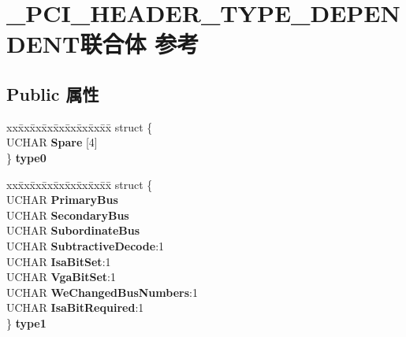 \hypertarget{union___p_c_i___h_e_a_d_e_r___t_y_p_e___d_e_p_e_n_d_e_n_t}{}\section{\+\_\+\+P\+C\+I\+\_\+\+H\+E\+A\+D\+E\+R\+\_\+\+T\+Y\+P\+E\+\_\+\+D\+E\+P\+E\+N\+D\+E\+N\+T联合体 参考}
\label{union___p_c_i___h_e_a_d_e_r___t_y_p_e___d_e_p_e_n_d_e_n_t}
\subsection*{Public 属性}
\begin{DoxyCompactItemize}
\item 
\mbox{\label{union___p_c_i___h_e_a_d_e_r___t_y_p_e___d_e_p_e_n_d_e_n_t_af89ec21f11e01bd34a64cc8f4c7dcf5a}} 
\begin{tabbing}
xx\=xx\=xx\=xx\=xx\=xx\=xx\=xx\=xx\=\kill
struct \{\\
\>UCHAR {\bfseries Spare} \mbox{[}4\mbox{]}\\
\} {\bfseries type0}\\

\end{tabbing}\item 
\mbox{\label{union___p_c_i___h_e_a_d_e_r___t_y_p_e___d_e_p_e_n_d_e_n_t_a53eafe1cb3c500a2bb9af43e15aa8904}} 
\begin{tabbing}
xx\=xx\=xx\=xx\=xx\=xx\=xx\=xx\=xx\=\kill
struct \{\\
\>UCHAR {\bfseries PrimaryBus}\\
\>UCHAR {\bfseries SecondaryBus}\\
\>UCHAR {\bfseries SubordinateBus}\\
\>UCHAR {\bfseries SubtractiveDecode}:1\\
\>UCHAR {\bfseries IsaBitSet}:1\\
\>UCHAR {\bfseries VgaBitSet}:1\\
\>UCHAR {\bfseries WeChangedBusNumbers}:1\\
\>UCHAR {\bfseries IsaBitRequired}:1\\
\} {\bfseries type1}\\


\end{tabbing}
\end{DoxyCompactItemize}
